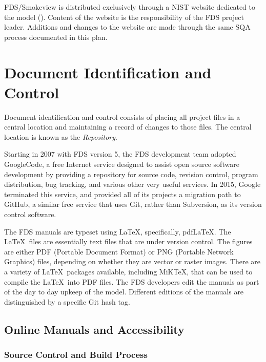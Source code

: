 \documentclass[11pt]{book}
\begin{document}
FDS/Smokeview is distributed exclusively through a NIST website dedicated to the model \linebreak (\href{https://pages.nist.gov/fds-smv} {}).  Content of the website is the responsibility of the FDS project leader. Additions and changes to the website are made through the same SQA process documented in this plan.


\section{Document Identification and Control}

Document identification and control consists of placing all project files in a central location and maintaining a record of changes to those files.
The central location is known as the {\em Repository}.

Starting in 2007 with FDS version 5, the FDS development team adopted GoogleCode, a free Internet service designed to assist open source software development by providing a repository for source code, revision control, program distribution, bug tracking, and various other very useful services. In 2015, Google terminated this service, and provided all of its projects a migration path to GitHub, a similar free service that uses Git, rather than Subversion, as its version control software.

The FDS manuals are typeset using \LaTeX, specifically, pdf\LaTeX. The \LaTeX\ files are essentially text files that are under version control. The figures are either PDF (Portable Document Format) or PNG (Portable Network Graphics) files, depending on whether they are vector or raster images. There are a variety of \LaTeX\ packages available, including MiKTeX, that can be used to compile the \LaTeX\ into PDF files. The FDS developers edit the manuals as part of the day to day upkeep of the model. Different editions of the manuals are distinguished by a specific Git hash tag.


\subsection{Online Manuals and Accessibility}
\label{sec:online_manuals_accessibility}

\subsubsection{Source Control and Build Process}
\end{document}
